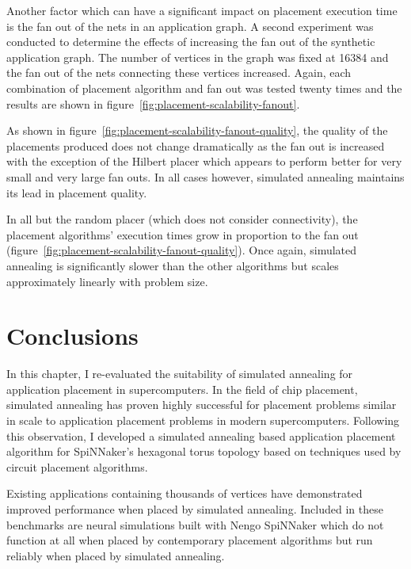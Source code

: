 				Another factor which can have a significant impact on placement
				execution time is the fan out of the nets in an application graph. A
				second experiment was conducted to determine the effects of increasing
				the fan out of the synthetic application graph. The number of vertices
				in the graph was fixed at \num{16384} and the fan out of the nets
				connecting these vertices increased. Again, each combination of
				placement algorithm and fan out was tested twenty times and the results
				are shown in figure~\ref{fig:placement-scalability-fanout}.
				
				As shown in figure~\ref{fig:placement-scalability-fanout-quality}, the
				quality of the placements produced does not change dramatically as the
				fan out is increased with the exception of the Hilbert placer which
				appears to perform better for very small and very large fan outs. In
				all cases however, simulated annealing maintains its lead in placement
				quality.
				
				In all but the random placer (which does not consider connectivity),
				the placement algorithms' execution times grow in proportion to the fan
				out (figure~\ref{fig:placement-scalability-fanout-quality}). Once
				again, simulated annealing is significantly slower than the other
				algorithms but scales approximately linearly with problem size.
	
	\section{Conclusions}
		
		In this chapter, I re-evaluated the suitability of simulated annealing for
		application placement in supercomputers. In the field of chip placement,
		simulated annealing has proven highly successful for placement problems
		similar in scale to application placement problems in modern
		supercomputers. Following this observation, I developed a simulated
		annealing based application placement algorithm for SpiNNaker's hexagonal
		torus topology based on techniques used by circuit placement algorithms.
		
		Existing applications containing thousands of vertices have demonstrated
		improved performance when placed by simulated annealing. Included in these
		benchmarks are neural simulations built with Nengo SpiNNaker which do not
		function at all when placed by contemporary placement algorithms but run
		reliably when placed by simulated annealing.
		
